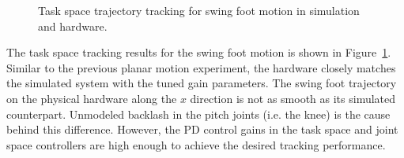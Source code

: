 \begin{figure}[!b]
	\begin{center}
	\end{center}
  	\caption{Task space trajectory tracking for swing foot motion in simulation and hardware.}
	\label{fig:swingfootp}
\end{figure} 

The task space tracking results for the swing foot motion is shown in Figure~\ref{fig:swingfootp}. Similar to the previous planar motion experiment, the hardware closely matches the simulated system with the tuned gain parameters. The swing foot trajectory on the physical hardware along the $x$ direction is not as smooth as its simulated counterpart. Unmodeled backlash in the pitch joints (i.e. the knee) is the cause behind this difference. However, the PD control gains in the task space and joint space controllers are high enough to achieve the desired tracking performance. 

